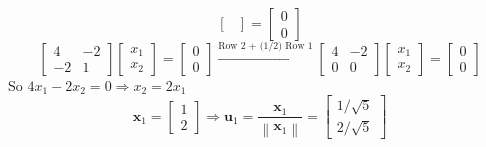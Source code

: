 \begin{enumerate}[font=\bfseries]
\begin{enumerate}
\[\begin{bmatrix}
                \end{bmatrix}
                =
                \begin{bmatrix}
                    0 \\
                    0
                \end{bmatrix}
            \]
            \[
                \begin{bmatrix}
                    4 & -2 \\
                    -2 & 1
                \end{bmatrix}
                \begin{bmatrix}
                    x_1 \\
                    x_2
                \end{bmatrix}
                =
                \begin{bmatrix}
                    0 \\
                    0
                \end{bmatrix}
                \overset{\text{Row 2 + (1/2) Row 1}}{\longrightarrow}
                \begin{bmatrix}
                    4 & -2 \\
                    0 & 0
                \end{bmatrix}
                \begin{bmatrix}
                    x_1 \\
                    x_2
                \end{bmatrix}
                =
                \begin{bmatrix}
                    0 \\
                    0
                \end{bmatrix}
            \]
            So $4x_1 - 2x_2 = 0 \Rightarrow x_2 = 2x_1$
            \[
                \mathbf{x}_1
                =
                \begin{bmatrix}
                    1 \\
                    2
                \end{bmatrix}
                \Rightarrow
                \mathbf{u}_1
                =
                \frac{\mathbf{x}_1}{\left\|\mathbf{x}_1\right\|}
                =
                \begin{bmatrix}
                    1/\sqrt{5} \\
                    2/\sqrt{5}
                \end{bmatrix}
\]
\end{enumerate}
\end{enumerate}
